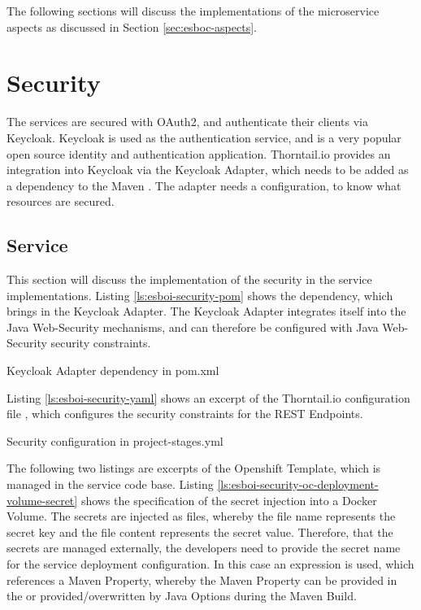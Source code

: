 The following sections will discuss the implementations of the microservice aspects as discussed in Section \vref{sec:esboc-aspects}.

\section{Security}
\label{sec:esbi-security}
The services are secured with OAuth2, and authenticate their clients via Keycloak. Keycloak is used as the authentication service, and is a very popular open source identity and authentication application. Thorntail.io provides an integration into Keycloak via the Keycloak Adapter, which needs to be added as a dependency to the Maven . The adapter needs a configuration, to know what resources are secured.

\subsection{Service}
\label{sec:esbi-security-service}
This section will discuss the implementation of the security in the service implementations. Listing \vref{ls:esboi-security-pom} shows the dependency, which brings in the Keycloak Adapter. The Keycloak Adapter integrates itself into the Java Web-Security mechanisms, and can therefore be configured with Java Web-Security security constraints.

\begin{listing}[h]
	\caption{Keycloak Adapter dependency in pom.xml}
	\label{ls:esboi-security-pom}
\end{listing}

Listing \vref{ls:esboi-security-yaml} shows an excerpt of the Thorntail.io configuration file , which configures the security constraints for the REST Endpoints.

\begin{listing}[h]
	\caption{Security configuration in project-stages.yml}
	\label{ls:esboi-security-yaml}
\end{listing}

The following two listings are excerpts of the  Openshift Template, which is managed in the service code base. Listing \vref{ls:esboi-security-oc-deployment-volume-secret} shows the specification of the secret injection into a Docker Volume. The secrets are injected as files, whereby the file name represents the secret key and the file content represents the secret value. Therefore, that the secrets are managed externally, the developers need to provide the secret name for the service deployment configuration. In this case an expression is used, which references a Maven Property, whereby the Maven Property can be provided in the  or provided/overwritten by Java Options during the Maven Build.
\newpage

